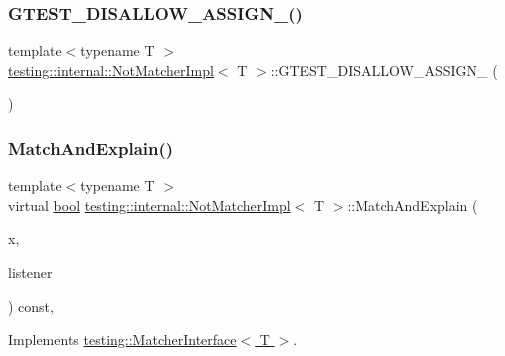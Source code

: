 \subsubsection{\texorpdfstring{G\+T\+E\+S\+T\+\_\+\+D\+I\+S\+A\+L\+L\+O\+W\+\_\+\+A\+S\+S\+I\+G\+N\+\_\+()}{GTEST\_DISALLOW\_ASSIGN\_()}}
{\footnotesize\ttfamily template$<$typename T $>$ \\
\hyperlink{classtesting_1_1internal_1_1NotMatcherImpl}{testing\+::internal\+::\+Not\+Matcher\+Impl}$<$ T $>$\+::G\+T\+E\+S\+T\+\_\+\+D\+I\+S\+A\+L\+L\+O\+W\+\_\+\+A\+S\+S\+I\+G\+N\+\_\+ (\begin{DoxyParamCaption}\item[{\hyperlink{classtesting_1_1internal_1_1NotMatcherImpl}{Not\+Matcher\+Impl}$<$ T $>$}]{ }\end{DoxyParamCaption})\hspace{0.3cm}{\ttfamily [private]}}

\mbox{\label{classtesting_1_1internal_1_1NotMatcherImpl_aff3743d9ffcd6dc54b389b5e23caacf3}} 
\subsubsection{\texorpdfstring{Match\+And\+Explain()}{MatchAndExplain()}}
{\footnotesize\ttfamily template$<$typename T $>$ \\
virtual \hyperlink{classbool}{bool} \hyperlink{classtesting_1_1internal_1_1NotMatcherImpl}{testing\+::internal\+::\+Not\+Matcher\+Impl}$<$ T $>$\+::Match\+And\+Explain (\begin{DoxyParamCaption}\item[{T}]{x,  }\item[{\hyperlink{classtesting_1_1MatchResultListener}{Match\+Result\+Listener} $\ast$}]{listener }\end{DoxyParamCaption}) const\hspace{0.3cm}{\ttfamily [inline]}, {\ttfamily [virtual]}}



Implements \hyperlink{classtesting_1_1MatcherInterface_a296b43607cd99d60365f0e6a762777cf}{testing\+::\+Matcher\+Interface$<$ T $>$}.



